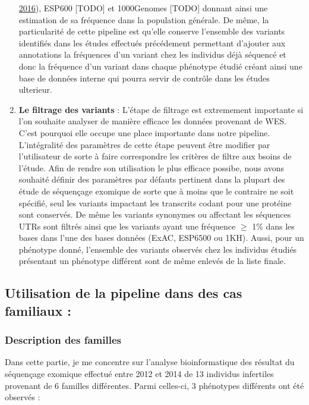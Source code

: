 \documentclass[12pt,twoside]{reedthesis}
\theoremstyle{definition}
\theoremstyle{definition}
\theoremstyle{remark}
\begin{document}
\begin{enumerate}
    \protect\hyperlink{ref-Lek2016}{2016}), ESP600 {[}TODO{]} et
    1000Genomes {[}TODO{]} donnant ainsi une estimation de sa fréquence
    dans la population générale. De même, la particularité de cette
    pipeline est qu'elle conserve l'ensemble des variants identifiés dans
    les études effectués précédement permettant d'ajouter aux annotations
    la fréquences d'un variant chez les individus déjà séquencé et donc la
    fréquence d'un variant dans chaque phénotype étudié créant ainsi une
    base de données interne qui pourra servir de contrôle dans les études
    ulterieur.
  \item
    \textbf{Le filtrage des variants} : L'étape de filtrage est
    extremement importante si l'on souhaite analyser de manière efficace
    les données provenant de WES. C'est pourquoi elle occupe une place
    importante dans notre pipeline. L'intégralité des paramètres de cette
    étape peuvent être modifier par l'utilisateur de sorte à faire
    correspondre les critères de filtre aux bsoins de l'étude. Afin de
    rendre son utilisation le plus efficace possibe, nous avons souhaité
    définir des paramètres par défauts pertinent dans la plupart des étude
    de séquençage exomique de sorte que à moins que le contraire ne soit
    spécifié, seul les variants impactant les transcrits codant pour une
    protéine sont conservés. De même les variants synonymes ou affectant
    les séquences UTRs sont filtrés ainsi que les variants ayant une
    fréquence \(\ge\) 1\% dans les bases dans l'une des bases données
    (ExAC, ESP6500 ou 1KH). Aussi, pour un phénotype donné, l'ensemble des
    variants observés chez les individus étudiés présentant un phénotype
    différent sont de même enlevés de la liste finale.
  \end{enumerate}
  
  \subsection{Utilisation de la pipeline dans des cas familiaux
  :}\label{utilisation-de-la-pipeline-dans-des-cas-familiaux}
  
  \subsubsection{Description des familles}\label{description-des-familles}
  
  Dans cette partie, je me concentre sur l'analyse bioinformatique des
  résultat du séquençage exomique effectué entre 2012 et 2014 de 13
  individus infertiles provenant de 6 familles différentes. Parmi
  celles-ci, 3 phénotypes différents ont été observés :
  
\end{document}

